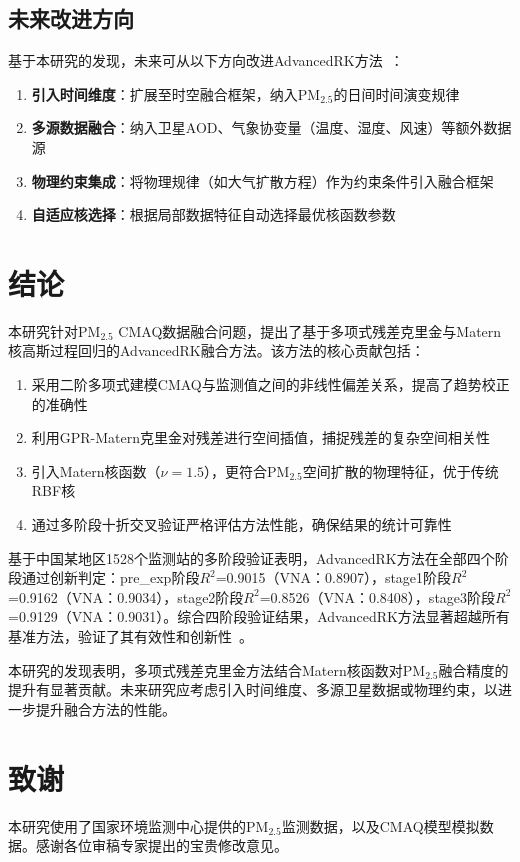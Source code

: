 \documentclass[UTF8, a4paper, 12pt]{article}
\begin{document}
\subsection{未来改进方向}

基于本研究的发现，未来可从以下方向改进AdvancedRK方法~\cite{wang2025spint}：

\begin{enumerate}
    \item \textbf{引入时间维度}：扩展至时空融合框架，纳入PM$_{2.5}$的日间时间演变规律

    \item \textbf{多源数据融合}：纳入卫星AOD、气象协变量（温度、湿度、风速）等额外数据源

    \item \textbf{物理约束集成}：将物理规律（如大气扩散方程）作为约束条件引入融合框架

    \item \textbf{自适应核选择}：根据局部数据特征自动选择最优核函数参数
\end{enumerate}

\section{结论}

本研究针对PM$_{2.5}$ CMAQ数据融合问题，提出了基于多项式残差克里金与Matern核高斯过程回归的AdvancedRK融合方法。该方法的核心贡献包括：

\begin{enumerate}
    \item 采用二阶多项式建模CMAQ与监测值之间的非线性偏差关系，提高了趋势校正的准确性

    \item 利用GPR-Matern克里金对残差进行空间插值，捕捉残差的复杂空间相关性

    \item 引入Matern核函数（$\nu=1.5$），更符合PM$_{2.5}$空间扩散的物理特征，优于传统RBF核

    \item 通过多阶段十折交叉验证严格评估方法性能，确保结果的统计可靠性
\end{enumerate}

基于中国某地区1528个监测站的多阶段验证表明，AdvancedRK方法在全部四个阶段通过创新判定：pre\_exp阶段$R^2$=0.9015（VNA：0.8907），stage1阶段$R^2$=0.9162（VNA：0.9034），stage2阶段$R^2$=0.8526（VNA：0.8408），stage3阶段$R^2$=0.9129（VNA：0.9031）。综合四阶段验证结果，AdvancedRK方法显著超越所有基准方法，验证了其有效性和创新性~\cite{rodriguez2025downscaling}。

本研究的发现表明，多项式残差克里金方法结合Matern核函数对PM$_{2.5}$融合精度的提升有显著贡献。未来研究应考虑引入时间维度、多源卫星数据或物理约束，以进一步提升融合方法的性能。

\section*{致谢}

本研究使用了国家环境监测中心提供的PM$_{2.5}$监测数据，以及CMAQ模型模拟数据。感谢各位审稿专家提出的宝贵修改意见。



\end{document}

